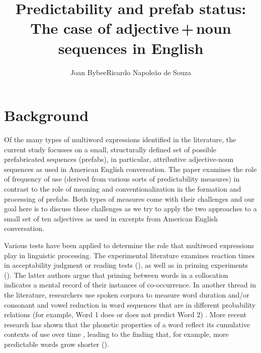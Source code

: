 \documentclass[output=paper]{langscibook}
\author{Joan Bybee\affiliation{University of New Mexico}\orcid{}\lastand Ricardo Napoleão de Souza\affiliation{University of Helsinki}\orcid{}}
\title[Predictability and prefab status: The case of adjective\,+\,noun sequences]{Predictability and prefab status: The case of adjective\,+\,noun sequences in English}
\begin{document}
\maketitle 

\section{Background}

Of the many types of multiword expressions identified in the literature, the current study focusses on a small, structurally defined set of possible prefabricated sequences (prefabs), in particular, attributive adjective-noun sequences as used in American English conversation. The paper examines the role of frequency of use (derived from various sorts of predictability measures) in contrast to the role of meaning and conventionalization in the formation and processing of prefabs. Both types of measures come with their challenges and our goal here is to discuss these challenges as we try to apply the two approaches to a small set of ten adjectives as used in excerpts from American English conversation. 

Various tests have been applied to determine the role that multiword expressions play in linguistic processing. The experimental literature examines reaction times in acceptability judgment or reading tests (\citealt{EllisEtAl2008,GyllstadWolter2014,WolterYamashita2018}), as well as in priming experiments (\citealt{DurrantDoherty2010}). The latter authors argue that priming between words in a collocation indicates a mental record of their instances of co-occurrence. In another thread in the literature, researchers use spoken corpora to measure word duration and\slash or consonant and vowel reduction in word sequences that are in different probability relations (for example, Word 1 does or does not predict Word 2) \citep{BellJurafsky2009}. More recent research has shown that the phonetic properties of a word reflect its cumulative contexts of use over time \citep{Seyfarth2014}, leading to the finding that, for example, more predictable words grow shorter (\citealt{SóskuthyHay2017}).
\end{document}
